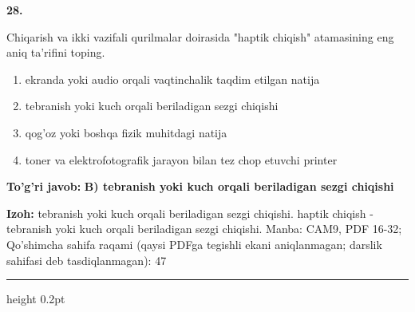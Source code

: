 \documentclass[10pt,a4paper]{article}
\begin{document}
{\bfseries\sffamily\color{ink} 28.}
\par
Chiqarish va ikki vazifali qurilmalar doirasida "haptik chiqish" atamasining eng aniq ta'rifini toping.
\begin{enumerate}[label=\Alph*),leftmargin=9mm]
\item ekranda yoki audio orqali vaqtinchalik taqdim etilgan natija
\item tebranish yoki kuch orqali beriladigan sezgi chiqishi
\item qog'oz yoki boshqa fizik muhitdagi natija
\item toner va elektrofotografik jarayon bilan tez chop etuvchi printer
\end{enumerate}
\begin{tcolorbox}[enhanced,breakable,colback=teal!4,colframe=teal!60!black,boxrule=0.45pt,arc=1.2mm,left=2.7mm,right=2.7mm,top=1.8mm,bottom=1.8mm,before skip=2mm,after skip=2mm]
{\bfseries\sffamily\color{teal}To'g'ri javob:} \textbf{B) tebranish yoki kuch orqali beriladigan sezgi chiqishi}
\par\smallskip
{\bfseries Izoh:} tebranish yoki kuch orqali beriladigan sezgi chiqishi. haptik chiqish - tebranish yoki kuch orqali beriladigan sezgi chiqishi. Manba: CAM9, PDF 16-32; Qo'shimcha sahifa raqami (qaysi PDFga tegishli ekani aniqlanmagan; darslik sahifasi deb tasdiqlanmagan): 47
\end{tcolorbox}
\vspace{2mm}\hrule height 0.2pt\vspace{3mm}
\end{document}
